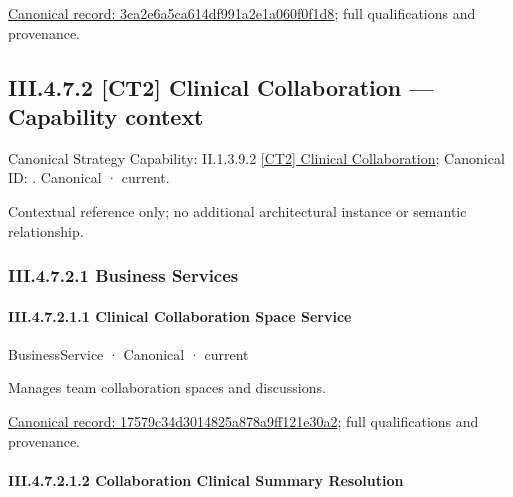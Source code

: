 {\footnotesize \href{../../../../continuum/business/business-function/3ca2e6a5ca614df991a2e1a060f0f1d8.md}{Canonical record: 3ca2e6a5ca614df991a2e1a060f0f1d8}; full qualifications and provenance.}\par
\subsection*{III.4.7.2 [CT2] Clinical Collaboration — Capability context}
\label{navigation:III.4.7.2}

{\small Canonical Strategy Capability: II.1.3.9.2 \hyperref[element:e6429225463a44d39f82e490e254e5d4]{[CT2] Clinical Collaboration}; Canonical ID: \texttt{}. Canonical · current.}\par
Contextual reference only; no additional architectural instance or semantic relationship.\par
\subsubsection*{III.4.7.2.1 Business Services}
\label{navigation:III.4.7.2.1}

\paragraph*{III.4.7.2.1.1 Clinical Collaboration Space Service}
\label{navigation:III.4.7.2.1.1}

\label{element:17579c34d3014825a878a9ff121e30a2}
{\small BusinessService · Canonical · current}\par

Manages team collaboration spaces and discussions.


{\footnotesize \href{../../../../continuum/business/business-service/17579c34d3014825a878a9ff121e30a2.md}{Canonical record: 17579c34d3014825a878a9ff121e30a2}; full qualifications and provenance.}\par
\paragraph*{III.4.7.2.1.2 Collaboration Clinical Summary Resolution}
\label{navigation:III.4.7.2.1.2}


